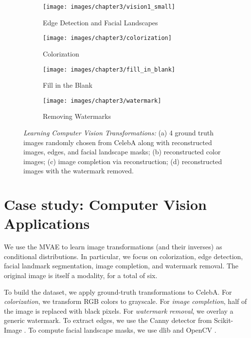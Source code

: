 \begin{figure}
\centering
    \begin{subfigure}[b]{.49\linewidth}
        \texttt{[image: images/chapter3/vision1\_small]}
        \caption{Edge Detection and Facial Landscapes}
    \end{subfigure}
    \begin{subfigure}[b]{.49\linewidth}
        \texttt{[image: images/chapter3/colorization]}
        \caption{Colorization}
    \end{subfigure}
    \begin{subfigure}[b]{.49\linewidth}
        \texttt{[image: images/chapter3/fill\_in\_blank]}
        \caption{Fill in the Blank}
    \end{subfigure}
    \begin{subfigure}[b]{.49\linewidth}
        \texttt{[image: images/chapter3/watermark]}
        \caption{Removing Watermarks}
    \end{subfigure}
    \caption{\textit{Learning Computer Vision Transformations:} (a) 4 ground truth images randomly chosen from CelebA along with reconstructed images, edges, and facial landscape masks; (b) reconstructed color images; (c) image completion via reconstruction; (d) reconstructed images with the watermark removed. }
    \label{fig:vision:images}
\end{figure}

\section{Case study: Computer Vision Applications}
We use the MVAE to learn image transformations (and their inverses) as conditional distributions. In particular, we focus on colorization, edge detection, facial landmark segmentation, image completion, and watermark removal. The original image is itself a modality, for a total of six.

To build the dataset, we apply ground-truth transformations to CelebA. For \textit{colorization}, we transform RGB colors to grayscale. For \textit{image completion}, half of the image is replaced with black pixels. For \textit{watermark removal}, we overlay a generic watermark. To extract edges, we use the Canny detector \cite{canny1987computational} from Scikit-Image \cite{van2014scikit}. To compute facial landscape masks, we use dlib \cite{king2009dlib} and OpenCV \cite{bradski2000opencv}.

